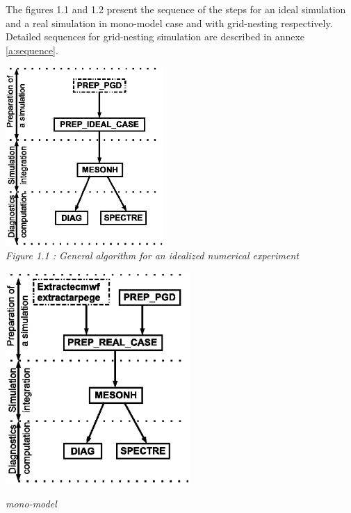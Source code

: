 The figures 1.1  and 1.2  present the sequence of the steps for an ideal simulation and a real simulation in mono-model case and with grid-nesting respectively. Detailed sequences for grid-nesting simulation are described in annexe \ref{a:sequence}.
\begin{center}
\includegraphics[width=6cm]{intro/magie3}
\\
\textit{Figure 1.1 : General algorithm for an idealized numerical experiment }
\end{center}
\begin{minipage}{8cm}
\vspace{5cm}
\includegraphics[width=7cm]{intro/magie2}
\begin{center}
\textit{mono-model}
\end{center}
\end{minipage}
